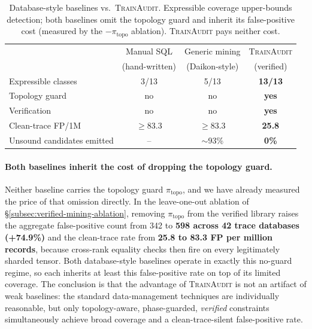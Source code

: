 \begin{table}[t]
\centering\small
\caption{Database-style baselines vs.\ \textsc{TrainAudit}. Expressible coverage upper-bounds detection; both baselines omit the topology guard and inherit its false-positive cost (measured by the $-\pi_{\text{topo}}$ ablation). \textsc{TrainAudit} pays neither cost.}
\label{tab:db-baselines}
\begin{tabular}{@{}lccc@{}}
\toprule
 & Manual SQL & Generic mining & \textsc{TrainAudit} \\
 & (hand-written) & (Daikon-style) & (verified) \\
\midrule
Expressible classes      & 3/13 & 5/13 & \textbf{13/13} \\
Topology guard           & no   & no   & \textbf{yes}  \\
Verification             & no   & no   & \textbf{yes}  \\
\midrule
Clean-trace FP/1M        & $\geq$83.3 & $\geq$83.3 & \textbf{25.8} \\
Unsound candidates emitted & --  & $\sim$93\% & \textbf{0\%} \\
\bottomrule
\end{tabular}
\end{table}

\paragraph{Both baselines inherit the cost of dropping the topology guard.} Neither baseline carries the topology guard $\pi_{\text{topo}}$, and we have already measured the price of that omission directly. In the leave-one-out ablation of \S\ref{subsec:verified-mining-ablation}, removing $\pi_{\text{topo}}$ from the verified library raises the aggregate false-positive count from 342 to \textbf{598 across 42 trace databases (+74.9\%)} and the clean-trace rate from \textbf{25.8 to 83.3 FP per million records}, because cross-rank equality checks then fire on every legitimately sharded tensor. Both database-style baselines operate in exactly this no-guard regime, so each inherits at least this false-positive rate on top of its limited coverage. The conclusion is that the advantage of \textsc{TrainAudit} is not an artifact of weak baselines: the standard data-management techniques are individually reasonable, but only topology-aware, phase-guarded, \emph{verified} constraints simultaneously achieve broad coverage and a clean-trace-silent false-positive rate.

